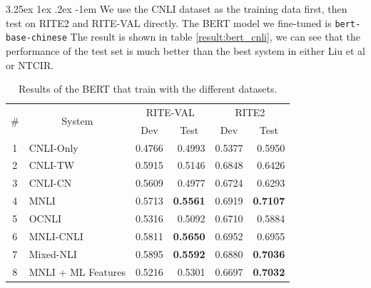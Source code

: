 \documentclass[12pt]{article}
\makeatletter
\renewcommand\paragraph{\@startsection{paragraph}{5}{\z@}%
  {3.25ex \@plus1ex \@minus.2ex}%
  {-1em}%
  {\normalfont\normalsize\bfseries}}
\makeatother
\begin{document}
\begin{CJK*}{UTF8}{bkai}
\begin{spacing}{1.77}
\paragraph{}
We use the CNLI dataset as the training data first, then test on RITE2 and RITE-VAL directly. The BERT model we fine-tuned is \texttt{bert-base-chinese} The result is shown in table \ref{result:bert_cnli}, we can see that the performance of the test set is much better than the best system in either Liu et al or NTCIR.

\begin{table}[H]
  \centering
  \setlength{\extrarowheight}{-3pt}
  \begin{tabular}{|c|l|r|r|r|r|}
  \hline
  \multirow{2}{*}{\#} & \multicolumn{1}{c|}{\multirow{2}{*}{System}} & \multicolumn{2}{c|}{RITE-VAL} & \multicolumn{2}{c|}{RITE2} \\ \cline{3-6}
   & \multicolumn{1}{c|}{} & \multicolumn{1}{c|}{Dev} & \multicolumn{1}{c|}{Test} & \multicolumn{1}{c|}{Dev} & \multicolumn{1}{c|}{Test} \\ \hline
  1 & CNLI-Only & 0.4766 & 0.4993 & 0.5377 & 0.5950 \\ \hline
  2 & CNLI-TW & 0.5915 & 0.5146 & 0.6848 & 0.6426 \\ \hline
  3 & CNLI-CN & 0.5609 & 0.4977 & 0.6724 & 0.6293 \\ \hline
  4 & MNLI & 0.5713 & \textbf{0.5561} & 0.6919 & \textbf{0.7107} \\ \hline
  5 & OCNLI & 0.5316 & 0.5092 & 0.6710 & 0.5884 \\ \hline
  6 & MNLI-CNLI & 0.5811 & \textbf{0.5650} & 0.6952 & 0.6955 \\ \hline
  7 & Mixed-NLI & 0.5895 & \textbf{0.5592} & 0.6880 & \textbf{0.7036} \\ \hline
  8 & MNLI + ML Features & 0.5216 & 0.5301 & 0.6697 & \textbf{0.7032} \\ \hline
  \end{tabular}
  \caption{Results of the BERT that train with the different datasets.}
  \label{result:bert_compare}
\end{table}


\end{spacing}
\end{CJK*}
\end{document}
